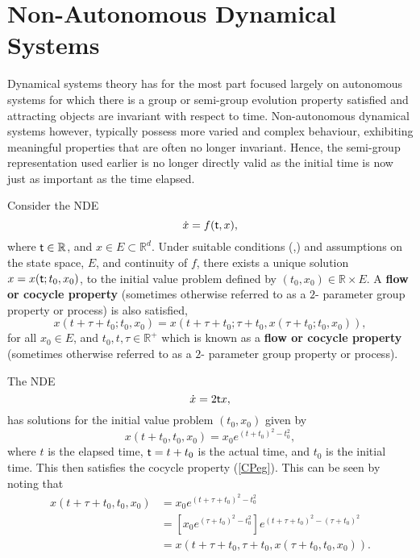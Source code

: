 \section{Non-Autonomous Dynamical Systems}
\label{NDSsec}

Dynamical systems theory has for the most part focused largely on
autonomous systems for which there is a group or semi-group
evolution property satisfied and attracting objects are invariant
with respect to time. Non-autonomous dynamical systems however,
typically possess more varied and complex behaviour,
exhibiting meaningful properties that are often no longer
invariant. Hence, the semi-group representation used earlier is no
longer directly valid as the initial time is now just as important
as the time elapsed.

\begin{eg}
 Consider the NDE
  \begin{equation}
  \label{NDE} %
  \dot{x} = f(\ta,x),
  \end{equation}
  where $ \mathsf{\mathsf{t}} \in \mathbb{R}$, and $x \in E \subset \mathbb{R}^d$. Under
  suitable conditions (\cite{Mo62},\cite{Re72}) and assumptions on the state
space, $E$, and   continuity of $f$, there exists a unique solution $x =
x( \mathsf{\mathsf{t}};t_0,x_0)$,  to the initial value problem defined by $(t_0, x_0 ) \in \mathbb{R} \times E$.
A  {\bf flow or cocycle property} (sometimes otherwise referred to as a $2$-
  parameter group property or process) is also satisfied,
  \begin{equation}
  \label{CPeg}
    x(t+\tau+t_0;t_0,x_0) = x(t+\tau+t_0;\tau+t_0,x(\tau+t_0;t_0,x_0)),
  \end{equation}
  for all $x_0 \in E$, and $t_0,t,\tau \in \mathbb{R}^+$ which is known as a
  {\bf flow or cocycle property} (sometimes otherwise referred to as a $2$-
  parameter group property or process).
\end{eg}
\begin{eg}
The NDE
\[ \dot{x} = 2 \mathsf{\mathsf{t}} x, \]
has solutions for the initial value problem $(t_0, x_0)$ given by
\[ x(t+t_0,t_0,x_0) = x_0 e^{(t+t_0)^2 - t_0^2}, \]
where $t$ is the elapsed time, $ \mathsf{\mathsf{t}} = t + t_0$ is the actual time, and $t_0$ is the initial time.
This then satisfies the cocycle property (\ref{CPeg}). This can be seen
by noting that
\begin{align*}
  x(t+\tau+t_0,t_0,x_0) &= x_0 e^{(t + \tau+ t_0)^2 - t_0^2} \\
                    &= [x_0 e^{(\tau+t_0)^2 - t_0^2}] e^{(t + \tau+ t_0)^2 -
                    (\tau+t_0)^2} \\
                    &= x(t+\tau+t_0,\tau+t_0,x(\tau+t_0,t_0,x_0)).
\end{align*}
\end{eg}

